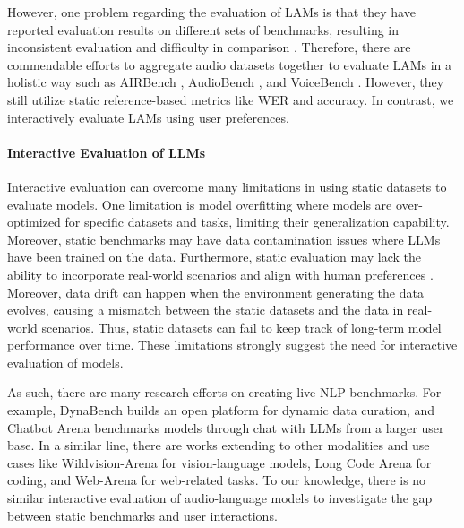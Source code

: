 However, one problem regarding the evaluation of LAMs is that they have reported evaluation results on different sets of benchmarks, resulting in inconsistent evaluation and difficulty in comparison \citep{wang2024audiobench}. Therefore, there are commendable efforts to aggregate audio datasets together to evaluate LAMs in a holistic way such as AIRBench \citep{yang2024air}, AudioBench \citep{wang2024audiobench}, and VoiceBench \citep{chen2024voicebench}. However, they still utilize static reference-based metrics like WER and accuracy. In contrast, we interactively evaluate LAMs using user preferences.

\paragraph{Interactive Evaluation of LLMs}
Interactive evaluation can overcome many limitations in using static datasets to evaluate models. One limitation is model overfitting \citep{ying2019overview} where models are over-optimized for specific datasets and tasks, limiting their generalization capability. Moreover, static benchmarks may have data contamination \citep{magar2022data} issues where LLMs have been trained on the data. Furthermore, static evaluation may lack the ability to incorporate real-world scenarios \citep{lin2024wildbench} and align with human preferences \citep{oren2023proving}. Moreover, data drift \citep{mallick2022matchmaker} can happen when the environment generating the data evolves, causing a mismatch between the static datasets and the data in real-world scenarios. Thus, static datasets can fail to keep track of long-term model performance over time. These limitations strongly suggest the need for interactive evaluation of models.

As such, there are many research efforts on creating live NLP benchmarks. For example, DynaBench \citep{kiela2021dynabench} builds an open platform for dynamic data curation, and Chatbot Arena \citep{chiang2024chatbot} benchmarks models through chat with LLMs from a larger user base. In a similar line, there are works extending to other modalities and use cases like Wildvision-Arena \citep{lu2024wildvision} for vision-language models, Long Code Arena \citep{bogomolov2024long} for coding, and Web-Arena \citep{zhou2023webarena} for web-related tasks. To our knowledge, there is no similar interactive evaluation of audio-language models to investigate the gap between static benchmarks and user interactions.